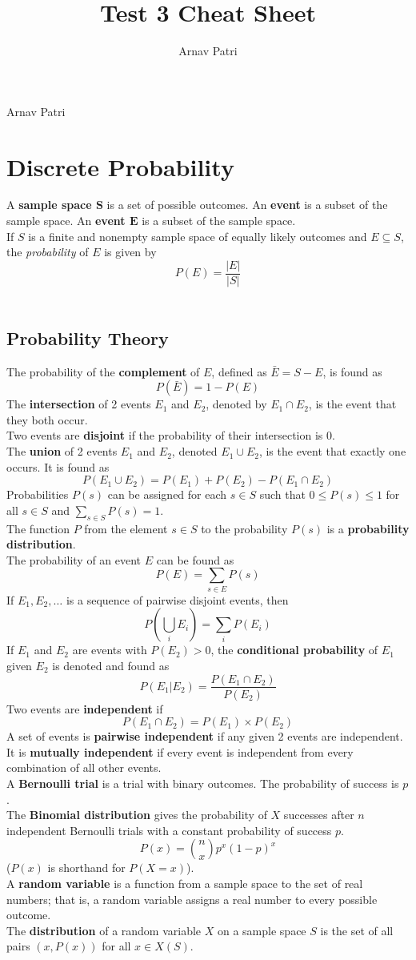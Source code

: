 \documentclass[12pt, A4, twocolumn]{article}
\title{Test 3 Cheat Sheet}
\author{Arnav Patri}
\begin{document}
	Arnav Patri
	\setcounter{section}{6}	
	\section{Discrete Probability}
		A \textbf{sample space \(\bm{S}\)} is a set of possible outcomes. An \textbf{event} is a subset of the sample space. An \textbf{event \(\bm{E}\)} is a subset of the sample space. \\
		If \(S\) is a finite and nonempty sample space of equally likely outcomes and \(E \subseteq S\), the \textit{probability} of \(E\) is given by
			\[P(E) = \frac{|E|}{|S|}\]
\		\setcounter{subsection}{1}
		\subsection{Probability Theory}
			The probability of the \textbf{complement} of \(E\), defined as \(\bar{E} = S - E\), is found as
				\[P(\bar{E}) = 1 - P(E)\]
			The \textbf{intersection} of 2 events \(E_1\) and \(E_2\), denoted by \(E_1 \cap E_2\), is the event that they both occur. \\
				Two events are \textbf{disjoint} if the probability of their intersection is 0. \\
			The \textbf{union} of 2 events \(E_1\) and \(E_2\), denoted \(E_1 \cup E_2\), is the event that exactly one occurs. It is found as
				\[P(E_1 \cup E_2) = P(E_1) + P(E_2) - P(E_1 \cap E_2)\]
			Probabilities \(P(s)\) can be assigned for each \(s \in S\) such that \(0 \le P(s) \le 1\) for all \(s \in S\) and \(\sum\limits_{s \in S}P(s) = 1\). \\
			The function \(P\) from the element \(s \in S\) to the probability \(P(s)\) is a \textbf{probability distribution}. \\
			The probability of an event \(E\) can be found as
				\[P(E) = \sum_{s \in E} P(s)\]
			If \(E_1, E_2, \ldots\) is a sequence of pairwise disjoint events, then
				\[P\left(\bigcup_i E_i\right) = \sum_i P(E_i)\]
			If \(E_1\) and \(E_2\) are events with \(P(E_2) > 0\), the \textbf{conditional probability} of \(E_1\) given \(E_2\) is denoted and found as
				\[P(E_1 | E_2) = \frac{P(E_1 \cap E_2)}{P(E_2)}\]
				Two events are \textbf{independent} if
				\[P(E_1 \cap E_2) = P(E_1) \times P(E_2)\]
				A set of events is \textbf{pairwise independent} if any given 2 events are independent. It is \textbf{mutually independent} if every event is independent from every combination of all other events. \\
			A \textbf{Bernoulli trial} is a trial with binary outcomes. The probability of success is \(p\). \\
			The \textbf{Binomial distribution} gives the probability of \(X\) successes after \(n\) independent Bernoulli trials with a constant probability of success \(p\).
				\[P(x) = \binom{n}{x}p^x(1 - p)^x \tag{binomial}\]
				(\(P(x)\) is shorthand for \(P(X = x)\)). \\
			A \textbf{random variable} is a function from a sample space to the set of real numbers; that is, a random variable assigns a real number to every possible outcome. \\
			The \textbf{distribution} of a random variable \(X\) on a sample space \(S\) is the set of all pairs \((x, P(x))\) for all \(x \in X(S)\).
\end{document}
